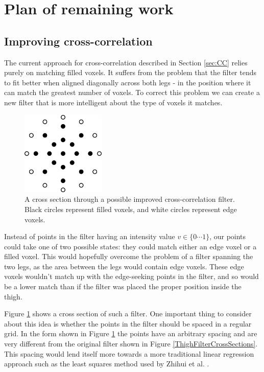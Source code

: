 \section{Plan of remaining work}

\subsection{Improving cross-correlation}\label{ImprovedCC}

The current approach for cross-correlation described in Section \ref{sec:CC} relies purely on matching filled voxels.
It suffers from the problem that the filter tends to fit better when aligned diagonally across both legs - in the position where it can match the greatest number of voxels.
To correct this problem we can create a new filter that is more intelligent about the type of voxels it matches.

\begin{figure}[b]
	\centering
	\includegraphics[width=4cm]{improvedfilter.png}
	\caption{A cross section through a possible improved cross-correlation filter.
		Black circles represent filled voxels, and white circles represent edge voxels.}
	\label{ImprovedFilter}
\end{figure}

Instead of points in the filter having an intensity value $v \in \{0 \cdots 1\}$, our points could take one of two possible states: they could match either an edge voxel or a filled voxel.
This would hopefully overcome the problem of a filter spanning the two legs, as the area between the legs would contain edge voxels.
These edge voxels wouldn't match up with the edge-seeking points in the filter, and so would be a lower match than if the filter was placed the proper position inside the thigh.

Figure \ref{ImprovedFilter} shows a cross section of such a filter.
One important thing to consider about this idea is whether the points in the filter should be spaced in a regular grid.
In the form shown in Figure \ref{ImprovedFilter} the points have an arbitrary spacing and are very different from the original filter shown in Figure \ref{ThighFilterCrossSections}.
This spacing would lend itself more towards a more traditional linear regression approach such as the least squares method used by Zhihui et al. \cite{LinearModelFitting}.
